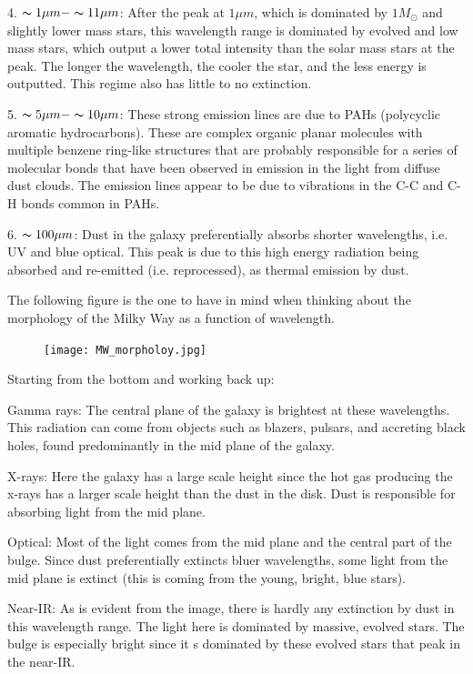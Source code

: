 \begin{enumerate}
4.  $  \thicksim 1 \mu m - \thicksim 11 \mu m$:  After the peak at $1 \mu m$, which is dominated by $1 M_\odot$ and slightly lower mass stars, this wavelength range is dominated by evolved and low mass stars, which output a lower total intensity than the solar mass stars at the peak.  The longer the wavelength, the cooler the star, and the less energy is outputted.  This regime also has little to no extinction.   

5.  $\thicksim 5 \mu m - \thicksim 10 \mu m$:  These strong emission lines are due to PAHs (polycyclic aromatic hydrocarbons).  These are complex organic planar molecules with multiple benzene ring-like structures that are probably responsible for a series of molecular bonds that have been observed in emission in the light from diffuse dust clouds.  The emission lines appear to be due to vibrations in the C-C and C-H bonds common in PAHs.  

6.  $\thicksim 100 \mu m$:  Dust in the galaxy preferentially absorbs shorter wavelengths, i.e. UV and blue optical.  This peak is due to this high energy radiation being absorbed and re-emitted (i.e. reprocessed), as thermal emission by dust.


The following figure is the one to have in mind when thinking about the morphology of the Milky Way as a function of wavelength.

\begin{figure}[!h]
\begin{center}
\texttt{[image: MW\_morpholoy.jpg]}
\end{center}
\end{figure}

Starting from the bottom and working back up:

Gamma rays:  The central plane of the galaxy is brightest at these wavelengths.  This radiation can come from objects such as blazers, pulsars, and accreting black holes, found predominantly in the mid plane of the galaxy.

X-rays:  Here the galaxy has a large scale height since the hot gas producing the x-rays has a larger scale height than the dust in the disk.  Dust is responsible for absorbing light from the mid plane.

Optical:  Most of the light comes from the mid plane and the central part of the bulge.  Since dust preferentially extincts bluer wavelengths, some light from the mid plane is extinct (this is coming from the young, bright, blue stars).

Near-IR:  As is evident from the image, there is hardly any extinction by dust in this wavelength range.  The light here is dominated by massive, evolved stars.  The bulge is especially bright since it s dominated by these evolved stars that peak in the near-IR.


\end{enumerate}
